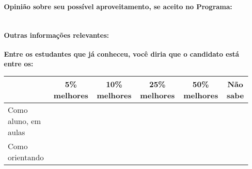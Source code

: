 \documentclass[11pt]{article}
\begin{document}
\textbf{Opinião sobre seu possível aproveitamento, se aceito no Programa:}
\\\\ 
\\
\textbf{Outras informações relevantes:} \\
\\[0.3cm]
\textbf{Entre os estudantes que já conheceu, você diria que o candidato está entre os:}
\\
\begin{tabular}{|l|c|c|c|c|c|}
\hline
 & 5\% melhores & 10\% melhores & 25\% melhores & 50\% melhores & Não sabe \\
\hline
Como aluno, em aulas &  &  &  &  & \\
\hline
Como orientando &  &  &  &  & \\
\hline
\end{tabular}
\end{document}
